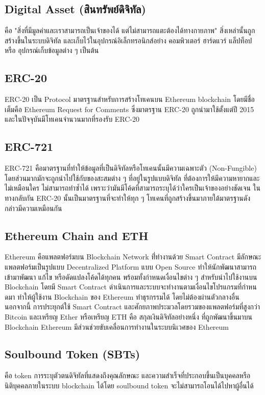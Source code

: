 \documentclass[12pt,oneside,openright,a4paper]{cpe-thai-project}
\begin{document}
\subsection{Digital Asset (สินทรัพย์ดิจิทัล)  \cite{digital-asset}}
\tab คือ "สิ่งที่มีมูลค่าและเราสามารถเป็นเจ้าของได้ แต่ไม่สามารถแตะต้องได้ทางกายภาพ" สิ่งเหล่านั้นถูกสร้างขึ้นในระบบดิจิทัล และเก็บไว้ในอุปกรณ์อิเล็กทรอนิกส์อย่าง คอมพิวเตอร์ ฮาร์ดแวร์ แล็ปท็อป หรือ อุปกรณ์เก็บข้อมูลต่าง ๆ เป็นต้น

\subsection{ERC-20 \cite{erc20}}
\tab ERC-20 เป็น Protocol มาตรฐานสําหรับการสร้างโทเคนบน Ethereum blockchain โดยมีชื่อเต็มคือ Ethereum Request for Comments ซึ่งมาตรฐาน ERC-20 ถูกนํามาใช้ตั้งแต่ปี 2015 และในปัจจุบันมีโทเคนจํานวนมากที่รองรับ ERC-20

\clearpage

\subsection{ERC-721  \cite{erc721}}
\tab ERC-721 คือมาตรฐานที่ทำให้ข้อมูลที่เป็นดิจิทัลหรือโทเคนนั้นมีความเฉพาะตัว (Non-Fungible) โดยส่วนมากมักจะถูกนำไปใช้กับของสะสมต่าง ๆ ที่อยู่ในรูปแบบดิจิทัล ที่ต้องการให้มีความหายากและไม่เหมือนใคร ไม่สามารถทำซ้ำได้ เพราะว่ามันมีโค้ดที่สามารถระบุได้ว่าใครเป็นเจ้าของอย่างชัดเจน ในทางกลับกัน ERC-20 นั้นเป็นมาตรฐานที่จะทำให้ทุก ๆ โทเคนที่ถูกสร้างขึ้นมาภายใต้มาตรฐานดังกล่าวมีความเหมือนกัน



\subsection{Ethereum Chain and ETH\cite{eth}}
\tab Ethereum คือแพลตฟอร์มบน Blockchain Network ที่่ทํางานด้วย Smart Contract มีลักษณะแพลตฟอร์มเป็นรูปแบบ Decentralized Platform แบบ Open Source ทําให้นักพัฒนาสามารถเข้ามาพัฒนา แก้ไข หรือดัดแปลงโค้ดได้ทุกคน พร้อมทั้งกําหนดเงื่อนไขต่าง ๆ สําหรับนําไปใช้งานบน Blockchain โดยมี Smart Contract ดําเนินการและระบบจะทํางานตามเงื่อนไขโปรแกรมที่กําหนดมา ทําให้ผู้ใช้งาน Blockchain ของ Ethereum ทําธุรกรรมได้ โดยไม่ต้องผ่านตัวกลางอื่น นอกจากนี้ การประยุกต์ใช้ Smart Contract และศักยภาพประมวลโดยรวมของแพลตฟอร์มที่สูงกว่า Bitcoin และเหรียญ Ether หรือเหรียญ ETH คือ สกุลเงินดิจิทัลอย่างหนึ่ง ที่ถูกพัฒนาขึ้นมาบน Blockchain Ethereum มีส่วนช่วยขับเคลื่อนการทํางานในระบบนิเวศของ Ethereum

\subsection{Soulbound Token (SBTs)\cite{sbts}}
\tab คือ token การระบุตัวตนดิจิทัลที่แสดงถึงคุณลักษณะ และความสำเร็จที่ประกอบขึ้นเป็นบุคคลหรือนิติบุคคลภายในระบบ blockchain ได้โดย soulbound token จะไม่สามารถโอนได้ไปหาผู้อื่นได้
\end{document}

